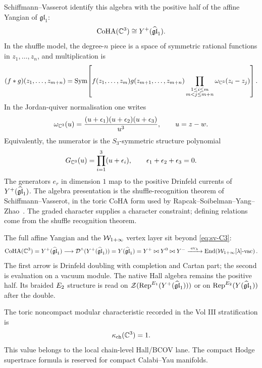 Schiffmann--Vasserot identify this algebra with the positive half of the affine
Yangian of $\mathfrak{gl}_1$:
\begin{equation}
\label{eq:sv-C3}
\mathrm{CoHA}(\mathbb{C}^3)
\cong
Y^{+}(\widehat{\mathfrak{gl}}_{1}).
\end{equation}
In the shuffle model, the degree-$n$ piece is a space of symmetric rational
functions in $z_1,\ldots,z_n$, and multiplication is
\begin{equation}
\label{eq:c3-shuffle-product}
(f*g)(z_1,\ldots,z_{m+n})
=
\operatorname{Sym}\!\left[
f(z_1,\ldots,z_m)g(z_{m+1},\ldots,z_{m+n})
\prod_{\substack{1\leq i\leq m\\m<j\leq m+n}}
\omega_{\mathbb{C}^3}(z_i-z_j)
\right].
\end{equation}
In the Jordan-quiver normalisation one writes
\begin{equation}
\label{eq:c3-shuffle-kernel}
\omega_{\mathbb{C}^3}(u)
=
\frac{(u+\epsilon_1)(u+\epsilon_2)(u+\epsilon_3)}
{u^3},
\qquad u=z-w.
\end{equation}
Equivalently, the numerator is the $S_3$-symmetric structure polynomial
\[
G_{\mathbb{C}^3}(u)=\prod_{i=1}^3(u+\epsilon_i),
\qquad
\epsilon_1+\epsilon_2+\epsilon_3=0 .
\]
The generators $e_r$ in dimension $1$ map to the positive Drinfeld currents of
$Y^{+}(\widehat{\mathfrak{gl}}_{1})$. The algebra presentation is the shuffle-recognition theorem
of Schiffmann--Vasserot, in the toric CoHA form used by
Rapcak--Soibelman--Yang--Zhao~\cite{SV2013,RSYZ2020}. The graded character
supplies a character constraint; defining relations come from the shuffle
recognition theorem.

The full affine Yangian and the $\mathcal{W}_{1+\infty}$ vertex layer sit beyond
\eqref{eq:sv-C3}:
\begin{equation}
\label{eq:c3-layer-chain}
\mathrm{CoHA}(\mathbb{C}^3)=Y^{+}(\widehat{\mathfrak{gl}}_{1})
\longrightarrow
\mathcal{D}^\wedge(Y^{+}(\widehat{\mathfrak{gl}}_{1}))
 =Y(\widehat{\mathfrak{gl}}_{1})=Y^{+}\bowtie Y^0\bowtie Y^-
\xrightarrow{\ \mathrm{ev}_{\lambda}\ }
\operatorname{End}\!\left(\mathcal{W}_{1+\infty}[\lambda]\text{-vac}\right).
\end{equation}
The first arrow is Drinfeld doubling with completion and Cartan part; the
second is evaluation on a vacuum module. The native Hall algebra remains the
positive half. Its
braided $E_{2}$ structure is read on
$\mathcal{Z}(\mathrm{Rep}^{E_{1}}(Y^{+}(\widehat{\mathfrak{gl}}_{1})))$ or on
$\mathrm{Rep}^{E_{2}}(Y(\widehat{\mathfrak{gl}}_{1}))$ after the double.

The toric noncompact modular characteristic recorded in the Vol III
stratification is
\[
 \kappa_{\mathrm{ch}}(\mathbb{C}^3)=1.
\]
This value belongs to the local chain-level Hall/BCOV lane. The compact Hodge
supertrace formula is reserved for compact Calabi--Yau manifolds.

